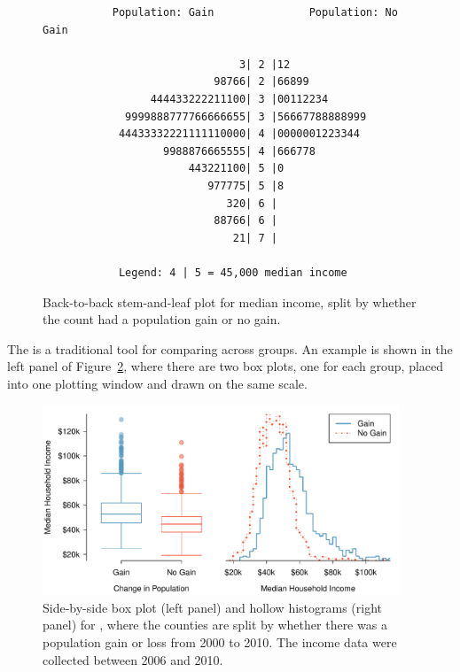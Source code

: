 \begin{figure}
\begin{verbatim}
           Population: Gain               Population: No Gain

                               3| 2 |12
                           98766| 2 |66899
                 444433222211100| 3 |00112234
             9999888777766666655| 3 |56667788888999
            44433332221111110000| 4 |0000001223344
                   9988876665555| 4 |666778
                       443221100| 5 |0
                          977775| 5 |8
                             320| 6 |
                           88766| 6 |
                              21| 7 |

            Legend: 4 | 5 = 45,000 median income
\end{verbatim}
\caption{Back-to-back stem-and-leaf plot for median income, split by whether the count had a population gain or no gain.}
\label{stemandleafincomepopgainloss}
\end{figure}

The   is a traditional tool for comparing across groups. An example is shown in the left panel of Figure~\ref{countyIncomeSplitByPopGain}, where there are two box plots, one for each group, placed into one plotting window and drawn on the same scale.

\begin{figure}
   \centering
   \includegraphics[width=0.95\textwidth]{ch_summarizing_data/figures/countyIncomeSplitByPopGain/countyIncomeSplitByPopGain}
   \caption{Side-by-side box plot (left panel) and hollow histograms (right panel) for , where the counties are split by whether there was a population gain or loss from 2000 to 2010. The income data were collected between 2006 and 2010.}
   \label{countyIncomeSplitByPopGain}
\end{figure}

